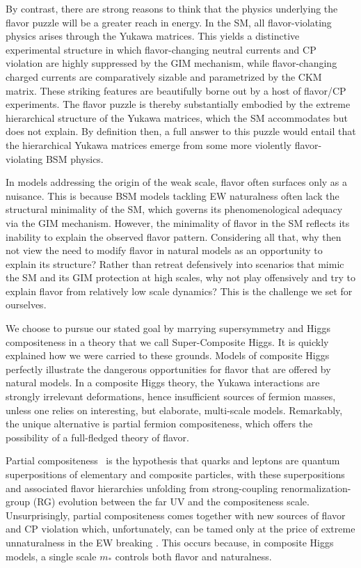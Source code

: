 \documentclass[a4paper,12pt]{article}
\begin{document}
By contrast, there are strong reasons to think that the physics underlying the flavor puzzle will be a greater reach in energy. In the SM, all flavor-violating physics arises through the Yukawa matrices. This yields a distinctive experimental structure in which flavor-changing neutral currents and CP violation are highly suppressed by the GIM mechanism, while flavor-changing charged currents are comparatively sizable and parametrized by the CKM matrix. These striking features are beautifully borne out by a host of flavor/CP experiments. The flavor puzzle is thereby substantially embodied by the extreme hierarchical structure of the Yukawa matrices, which the SM accommodates but does not explain. By definition then, a full answer to this puzzle would entail that the hierarchical Yukawa matrices emerge from some more violently flavor-violating BSM physics. 

In models addressing the origin of the weak scale, flavor often surfaces only as a nuisance. This is because BSM models tackling EW naturalness often lack the structural minimality of the SM, which governs its phenomenological adequacy via the GIM mechanism. However, the minimality of flavor in the SM reflects its inability to explain the observed flavor pattern. Considering all that, why then not view the need to modify flavor in natural models as an opportunity to explain its structure? Rather than retreat defensively into scenarios that mimic the SM and its GIM protection at high scales, why not play offensively and try to explain flavor from relatively low scale dynamics? This is the challenge we set for ourselves. 

We choose to pursue our stated goal by marrying supersymmetry and Higgs compositeness in a theory that we call Super-Composite Higgs. It is quickly explained how we were carried to these grounds. Models of composite Higgs perfectly illustrate the dangerous opportunities for flavor that are offered by natural models. In a composite Higgs theory, the Yukawa interactions are strongly irrelevant deformations,  hence insufficient sources of  fermion masses, unless one relies on interesting, but elaborate, multi-scale models. Remarkably, the unique alternative is partial fermion compositeness, which offers the possibility of a full-fledged theory of flavor. 

Partial compositeness~\cite{Kaplan:1991dc} is the hypothesis that quarks and leptons are quantum superpositions of elementary and composite particles, with these superpositions and associated flavor hierarchies unfolding from strong-coupling renormalization-group (RG) evolution between the far UV and the compositeness scale. Unsurprisingly, partial compositeness comes together with new sources of flavor and CP violation which, unfortunately, can be tamed only at the price of extreme unnaturalness in the EW breaking \cite{Glioti:2024hye}. This occurs because, in composite Higgs models, a single scale $m_*$ controls both flavor and naturalness. 
\end{document}
